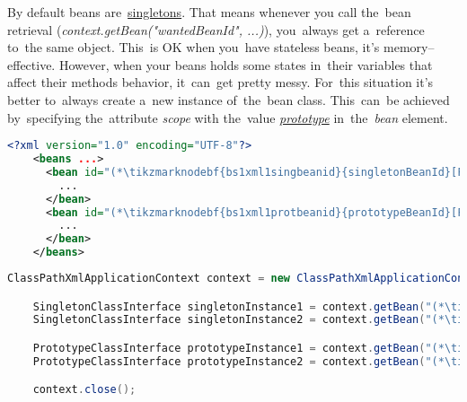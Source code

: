 By default beans are~\hyperref[singletondp]{singletons}. That means whenever you call the~bean retrieval (\textit{context.getBean("wantedBeanId", ...)}), you~always get a~reference to~the same object. This~is OK when you~have stateless beans, it's memory--effective. However, when your beans holds some states in~their variables that affect their methods behavior, it~can~get pretty messy. For~this situation it's better to~always create a~new instance of~the~bean class. This~can~be achieved by~specifying the~attribute \textit{scope} with the~value \hyperref[prototypedp]{\textit{prototype}} in~the~\textit{bean} element.

\example
\begin{lstlisting}[language=XML, title={Configuration XML}]
    <?xml version="1.0" encoding="UTF-8"?>
    <beans ...>
      <bean id="(*\tikzmarknodebf{bs1xml1singbeanid}{singletonBeanId}[ForestGreen]*)" class="package.subfolder.SingletonClass">
        ...
      </bean>
      <bean id="(*\tikzmarknodebf{bs1xml1protbeanid}{prototypeBeanId}[ForestGreen]*)" class="package.subfolder.PrototypeClass" scope="prototype">
        ...
      </bean>
    </beans>
\end{lstlisting}
\begin{lstlisting}[language=Java, title={Usage}]
    ClassPathXmlApplicationContext context = new ClassPathXmlApplicationContext("configurationFile.xml");

    SingletonClassInterface singletonInstance1 = context.getBean("(*\tikzmarknodebf{bs1java1singbeanid1}{singletonBeanId}[ForestGreen]*)", SingletonClassInterface.class);
    SingletonClassInterface singletonInstance2 = context.getBean("(*\tikzmarknodebf{bs1java1singbeanid2}{singletonBeanId}[ForestGreen]*)", SingletonClassInterface.class);

    PrototypeClassInterface prototypeInstance1 = context.getBean("(*\tikzmarknodebf{bs1java1protbeanid1}{prototypeBeanId}[ForestGreen]*)", PrototypeClassInterface.class);
    PrototypeClassInterface prototypeInstance2 = context.getBean("(*\tikzmarknodebf{bs1java1protbeanid2}{prototypeBeanId}[ForestGreen]*)", PrototypeClassInterface.class);

    context.close();
\end{lstlisting}

